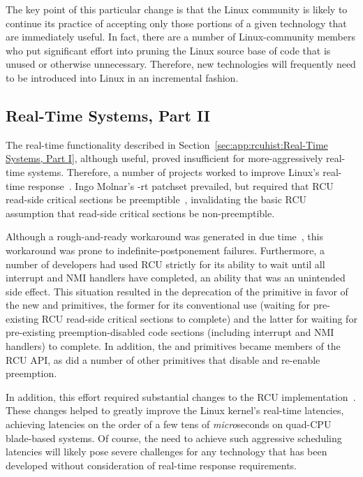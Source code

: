 The key point of this particular change is that the Linux community
is likely to continue its practice of accepting only those portions
of a given technology that are immediately useful.
In fact, there are a number of Linux-community members who put significant
effort into pruning the Linux source base of code that is unused or
otherwise unnecessary.
Therefore, new technologies will frequently need to be introduced
into Linux in an incremental fashion.

\subsection{Real-Time Systems, Part II}
\label{sec:app:rcuhist:Real-Time Systems, Part II}

The real-time functionality described in
Section~\ref{sec:app:rcuhist:Real-Time Systems, Part I}, although useful,
proved insufficient for more-aggressively real-time systems.
Therefore, a number of projects worked to improve Linux's real-time
response~\cite{JonCorbet2004RealTimeLinuxPart1}.
Ingo Molnar's -rt patchset prevailed, but required that RCU read-side
critical sections be preemptible~\cite{JonCorbet2004RealTimeLinuxPart2},
invalidating the basic RCU assumption that read-side critical sections
be non-preemptible.

Although a rough-and-ready workaround was generated in
due time~\cite{JonCorbet2005a}, this workaround was prone to
indefinite-postponement failures.
Furthermore, a number of developers had used RCU strictly for its
ability to wait until all interrupt and NMI handlers have completed,
an ability that was an unintended side effect.
This situation resulted in the deprecation of the
 primitive in favor of the new
 and  primitives,
the former for its conventional use (waiting for pre-existing RCU read-side
critical sections to complete) and the latter for waiting
for pre-existing preemption-disabled code sections
(including interrupt and NMI handlers) to complete.
In addition, the  and
 primitives became members of the RCU API,
as did a number of other primitives that disable and re-enable preemption.

In addition, this effort required substantial changes to the RCU
implementation~\cite{PaulEMcKenney2007PreemptibleRCU}.
These changes helped to greatly improve the Linux kernel's real-time
latencies, achieving latencies on the order of a few tens of
\emph{micro}seconds on quad-CPU blade-based systems.
Of course, the need to achieve such aggressive scheduling latencies will
likely pose severe challenges for any technology that has been developed
without consideration of real-time response requirements.

